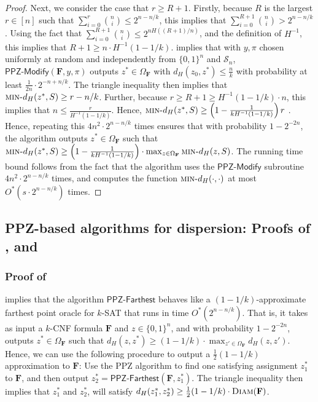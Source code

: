 \documentclass[11pt, letterpaper]{article}
\theoremstyle{definition}
\newcommand{\Q}[1]{\{0,1\}^{#1}}
\newcommand{\f}{\mathbf{F}}
\newcommand{\Om}{\Omega_{\f}}
\newcommand{\mind}{\textsc{min-}d_H}
\newcommand{\D}{\textsc{Diam}}
\newcommand{\PPZMod}{\textsf{PPZ-Modify}}
\begin{document}
\begin{proof}
     Next, we consider the case that $r \geq R+1$. Firstly, because $R$ is the largest $r \in [n]$ such that $\sum_{i = 0}^r\binom{n}{i} \leq 2^{n-n/k}$, this implies that $\sum_{i = 0}^{R+1}\binom{n}{i} > 2^{n-n/k}$. Using the fact that $\sum_{i = 0}^{R+1}\binom{n}{i} \leq 2^{n H((R+1)/n)}$, and the definition of $H^{-1}$, this implies that $R+1 \geq n \cdot H^{-1}(1-1/k)$.  implies that with $y, \pi$ chosen uniformly at random and independently from $\{0,1\}^n$ and $\mathcal{S}_n$, $\PPZMod(\f, y, \pi)$ outputs $z^* \in \Om$ with $d_H(z_0,z^*) \leq \frac{n}{k}$ with probability at least $\frac{1}{2n} \cdot 2^{-n+n/k}$. The triangle inequality then implies that $\mind(z^*,S) \geq r-n/k$. Further, because $r \geq R+1 \geq H^{-1}(1-1/k) \cdot n$, this implies that $n \leq \frac{r}{H^{-1}(1-1/k)}$. Hence, $\mind(z^*,S) \geq \left(1-\frac{1}{kH^{-1}(1-1/k)}\right) r$ . Hence, repeating this $4n^2 \cdot 2^{n-n/k}$ times ensures that with probability $1-2^{-2n}$, the algorithm outputs $z^* \in \Om$ such that $\mind(z^*, S) \geq \left(1-\frac{1}{kH^{-1}(1-1/k)}\right) \cdot \max_{z \in \Om} \mind(z, S)$. The running time bound follows from the fact that the algorithm uses the $\PPZMod$ subroutine $4n^2 \cdot 2^{n-n/k}$ times, and computes the function $\mind(\cdot, \cdot)$ at most $O^*\left(s \cdot 2^{n-n/k}\right)$ times.
 \end{proof}
 \subsection{PPZ-based algorithms for dispersion: Proofs of ,  and } \label{sec:finalppz}  
 
 \subsubsection*{Proof of } implies that the algorithm $\textsf{PPZ-Farthest}$ behaves like a $(1-1/k)$-approximate farthest point oracle for $k$-SAT that runs in time $O^*(2^{n-n/k})$. That is, it takes as input a $k$-CNF formula $\f$ and $z \in \Q{n}$, and with probability $1-2^{-2n}$, outputs $z^* \in \Om$ such that $d_H(z, z^*) \geq (1-1/k) \cdot \max_{z' \in \Om} d_H(z,z')$. Hence, we can use the following procedure to output a $\frac{1}{2} \left(1-1/k\right)$ approximation to $\f$: Use the PPZ algorithm to find one satisfying assignment $z_1^*$ to $\f$, and then output $z_2^*=\textsf{PPZ-Farthest}(\f, z_1^*)$. The triangle inequality then implies that $z_1^*$ and $z_2^*$, will satisfy $d_H(z_1^*, z_2^*) \geq \frac{1}{2} (1-1/k) \cdot \D(\f)$.
\end{document}
